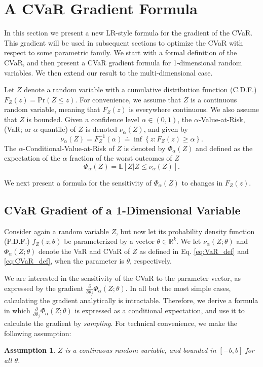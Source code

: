 \documentclass[letterpaper]{article}
\newcommand{\prob}{\mathrm{Pr}}
\newcommand{\E}{\mathbb{E}}
\newcommand{\R}{\mathbb{R}}
\newcommand{\cvar}{\Phi_\alpha}
\newcommand{\var}{\nu_\alpha}
\newcommand{\Dth}{\frac{\partial}{\partial \theta_j}}
\newtheorem{assumption}{Assumption}
\begin{document}
\section{A CVaR Gradient Formula}\label{sec:CVaR_Sensitivity}

In this section we present a new LR-style formula for the gradient of the CVaR. This gradient will be used in subsequent sections to optimize the CVaR with respect to some parametric family.
We start with a formal definition of the CVaR, and then present a CVaR gradient formula for 1-dimensional random variables. We then extend our result to the multi-dimensional case.

Let $Z$ denote a random variable with a cumulative distribution function (C.D.F.) $F_Z(z) = \prob(Z \leq z)$. For convenience, we assume that $Z$ is a continuous random variable, meaning that $F_Z(z)$ is everywhere continuous. We also assume that $Z$ is bounded.
Given a confidence level $\alpha\in (0,1)$, the $\alpha$-Value-at-Risk, (VaR; or $\alpha$-quantile) of $Z$ is denoted $\var(Z)$, and given by
\begin{equation}\label{eq:VaR_def}
\var (Z) = F_Z^{-1}(\alpha) \doteq \inf\left\{z:F_Z(z) \geq \alpha \right\}.
\end{equation}
The $\alpha$-Conditional-Value-at-Risk of $Z$ is denoted by $\cvar(Z)$ and defined as the expectation of the $\alpha$ fraction of the worst outcomes of $Z$
\begin{equation}\label{eq:CVaR_def}
\cvar (Z) = \E \left[ \left. Z \right| Z \leq \var (Z)\right].
\end{equation}

We next present a formula for the sensitivity of $\cvar(Z)$ to changes in $F_Z(z)$.
\subsection{CVaR Gradient of a 1-Dimensional Variable}\label{ssec:1D_formula}

Consider again a random variable $Z$, but now let its probability density function (P.D.F.) $f_Z(z;\theta)$ be parameterized by a vector $\theta \in \R^k$. We let $\var (Z;\theta)$ and $\cvar (Z;\theta)$ denote the VaR and CVaR of $Z$ as defined in Eq. \eqref{eq:VaR_def} and \eqref{eq:CVaR_def}, when the parameter is $\theta$, respectively.

We are interested in the sensitivity of the CVaR to the parameter vector, as expressed by the gradient $\Dth \cvar (Z;\theta)$. In all but the most simple cases, calculating the gradient analytically is intractable. Therefore, we derive a formula in which $\Dth \cvar (Z;\theta)$ is expressed as a conditional expectation, and use it to calculate the gradient by \emph{sampling}.
For technical convenience, we make the following assumption:
\begin{assumption}\label{assumption:bounded_cont_Z}
$Z$ is a continuous random variable, and bounded in $[-b,b]$ for all $\theta$.
\end{assumption}
\end{document}
